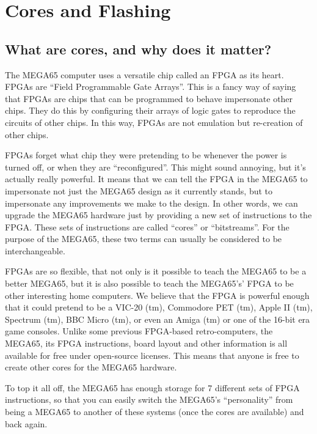 \chapter{Cores and Flashing}
\label{cha:cores}

\section{What are cores, and why does it matter?}

The MEGA65 computer uses a versatile chip called an FPGA as its heart.
FPGAs are ``Field Programmable Gate Arrays''. This is a fancy way of
saying that FPGAs are chips that can be programmed to behave impersonate
other chips.  They do this by configuring their arrays of logic gates to
reproduce the circuits of other chips. In this way, FPGAs are not emulation
but re-creation of other chips.

FPGAs forget what chip they were pretending
to be whenever the power is turned off, or when they are ``reconfigured''.
This might sound annoying, but it's actually really powerful. It means that
we can tell the FPGA in the MEGA65 to impersonate not just the MEGA65 design
as it currently stands, but to impersonate any improvements we make to the design.
In other words, we can upgrade the MEGA65 hardware just by providing a new
set of instructions to the FPGA.  These sets of instructions are called ``cores''
or ``bitstreams''.  For the purpose of the MEGA65, these two terms can usually be
considered to be interchangeable.

FPGAs are so flexible, that not only is it possible to teach the MEGA65 to be a better
MEGA65, but it is also possible to teach the MEGA65's' FPGA to be other interesting
home computers.  We believe that the FPGA is powerful enough that it could pretend to be
a VIC-20 (tm), Commodore PET (tm), Apple II (tm), Spectrum (tm), BBC Micro (tm), or even
an Amiga (tm) or one of the 16-bit era game consoles.  Unlike some previous FPGA-based
retro-computers, the MEGA65, its FPGA instructions, board layout and other information is
all available for free under open-source licenses. This means that anyone is free to
create other cores for the MEGA65 hardware.

To top it all off, the MEGA65 has enough storage for 7 different sets of FPGA instructions,
so that you can easily switch the MEGA65's ``personality'' from being a MEGA65 to another
of these systems (once the cores are available) and back again.

